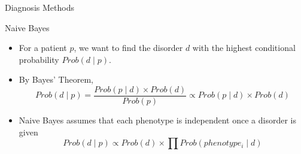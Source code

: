 \documentclass[final]{beamer} %
\begin{document}
\begin{frame}{}
\begin{columns}[T]
\begin{column}{0.3\linewidth}
{     \begin{block}{\Huge Diagnosis Methods}
     \end{block}
     \begin{block}{\Large Naive Bayes}
       \begin{itemize}
         \Large
       \item For a patient $p$, we want to find the disorder $d$ with
         the highest conditional probability $Prob(d \mid p )$.
       \item By Bayes' Theorem,
         \[Prob(d \mid p) = \frac{Prob(p \mid d) \times
           Prob(d)}{Prob(p)} \propto Prob(p \mid d) \times Prob(d)\]
       \item Naive Bayes assumes that each phenotype is independent
         once a disorder is given
         \[Prob(d \mid p) \propto Prob(d) \times \prod
         Prob(phenotype_i \mid d)\]
       \end{itemize}
     \end{block}

}
\end{column}
\end{columns}
\end{frame}
\end{document}
